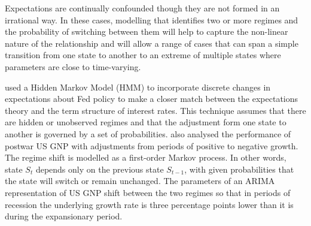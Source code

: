 \documentclass[12pt, a4paper, oneside]{article} %
\begin{document}

Expectations are continually confounded though they are not formed in an irrational way. In these cases, modelling that identifies two or more regimes and the probability of switching between them will help to capture the non-linear nature of the relationship and will allow a range of cases that can span a simple transition from one state to another to an extreme of multiple states where parameters are close to time-varying.  

\citet{hamilton1988rational} used a Hidden Markov Model (HMM) to incorporate discrete changes in expectations about Fed policy to make a closer match between the expectations theory and the term structure of interest rates.  This technique assumes that there are hidden or unobserved regimes and that the adjustment form one state to another is governed by a set of probabilities.  \citet{Hamilton1989} also analysed the performance of postwar US GNP with adjustments from periods of positive to negative growth. The regime shift is modelled as a first-order Markov process.  In other words, state $S_t$ depends only on the previous state $S_{t-1}$, with given probabilities that the state will switch or remain unchanged.  The parameters of an ARIMA representation of US GNP shift between the two regimes so that in periods of recession the underlying growth rate is three percentage points lower than it is during the expansionary period.   


\end{document}
